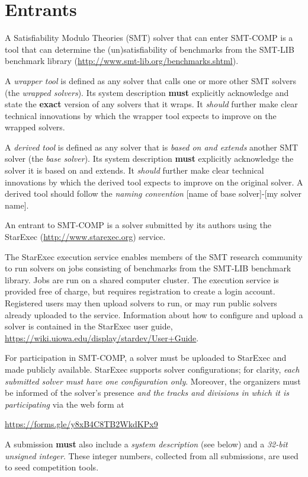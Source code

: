 \documentclass[12pt]{article}
\begin{document}

\section{Entrants}
\label{sec:entrants}

%
A Satisfiability Modulo Theories (SMT) solver that can enter SMT-COMP is a tool that can determine the
(un)satisfia\-bility of benchmarks from the SMT-LIB benchmark library
(\url{http://www.smt-lib.org/benchmarks.shtml}).

%
A \emph{wrapper tool} is defined as any solver that calls one or more other SMT
solvers (the \emph{wrapped solvers}). Its system description \textbf{must}
explicitly acknowledge and state the \textbf{exact} version of any solvers that
it wraps.  It \emph{should} further make clear technical innovations by which
the wrapper tool expects to improve on the wrapped solvers.

%
A \emph{derived tool} is defined as any solver that is \emph{based on and
extends} another SMT solver (the \emph{base solver}).  Its system description
\textbf{must} explicitly acknowledge
the solver it is based on and extends.  It \emph{should} further make clear
technical innovations by which the derived tool expects to improve on the
original solver.  A derived tool should follow the \emph{naming convention}
{[name of base solver]-[my solver name]}.

%
An entrant to SMT-COMP is a solver submitted by its authors using
the StarExec (\url{http://www.starexec.org}) service.

%
The StarExec execution
service enables members of the SMT research community to run solvers
on jobs consisting of benchmarks from the SMT-LIB benchmark library.
Jobs are run on a shared computer cluster.  The execution service is
provided free of charge, but requires registration to create a
login account.  Registered users may then upload solvers to
run, or may run public solvers already uploaded to the service.
Information about how to configure and upload a solver is contained in
the StarExec user guide,
\url{https://wiki.uiowa.edu/display/stardev/User+Guide}.

%
For participation in SMT-COMP, a solver must be uploaded to StarExec
and made publicly available.  StarExec supports solver configurations;
for clarity, \emph{each submitted solver must have one configuration
  only}.  Moreover, the organizers must be informed of the solver's
presence \emph{and the tracks and divisions in which it is
  participating} via the web form at
\begin{center}
  \url{https://forms.gle/y8xB4C8TB2WkdKPx9}
\end{center}
A submission \textbf{must} also include a \emph{system description} (see below)
and a \emph{32-bit unsigned integer}.
 These integer numbers, collected from all submissions, are used to seed
 competition tools.
\end{document}
